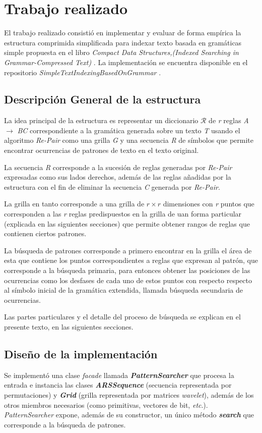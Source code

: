 \chapter{Trabajo realizado}
El trabajo realizado consistió en implementar y evaluar de forma empírica la estructura comprimida
simplificada para indexar texto basada en gramáticas simple propuesta en el libro \textit{Compact Data
Structures,(Indexed Searching in Grammar-Compressed Text)} \cite[Capítulo~10.5.6]{Navarro}. La implementación se encuentra disponible en el repositorio \textit{SimpleTextIndexingBasedOnGrammar}
\cite{SimpleTextIndexing}.

\section{Descripción General de la estructura}
La idea principal de la estructura es representar un diccionario $\mathcal{R}$ de \textit{r} reglas \textit{A} $\rightarrow$ \textit{BC} correspondiente a la gramática generada sobre un texto \textit{T} usando el algoritmo \textit{Re-Pair} como una grilla \textit{G} y una secuencia \textit{R} de símbolos que permite encontrar ocurrencias de patrones de texto en el texto original. 

La secuencia \textit{R} corresponde a la sucesión de reglas generadas por \textit{Re-Pair} expresadas como sus lados derechos, además de las reglas añadidas por la estructura con el fin de eliminar la secuencia \textit{C} generada por \textit{Re-Pair}.

La grilla en tanto corresponde a una grilla de $r \times r$ dimensiones con \textit{r} puntos que corresponden a las \textit{r} reglas predispuestos en la grilla de uan forma particular (explicada en las siguientes secciones) que permite obtener rangos de reglas que contienen ciertos patrones.

La búsqueda de patrones corresponde a primero encontrar en la grilla el área de esta que contiene los puntos correspondientes a reglas que expresan al patrón, que corresponde a la búsqueda primaria, para entonces obtener las posiciones de las ocurrencias como los desfases de cada uno de estos puntos con respecto respecto al símbolo inicial de la gramática extendida, llamada búsqueda secundaria de ocurrencias.

Las partes particulares y el detalle del proceso de búsqueda se explican en el presente texto, en las siguientes secciones.

\section{Diseño de la implementación}
Se implementó una clase \textit{facade} llamada \textit{\textbf{PatternSearcher}} que procesa la entrada e instancia las clases \textit{\textbf{ARSSequence}} (secuencia representada por permutaciones) y \textbf{\textit{Grid}} (grilla representada por matrices \textit{wavelet}), además de los otros miembros necesarios (como primitivas, vectores de bit, \textit{etc}.). \textit{PatternSearcher} expone, además de su constructor, un único método \textit{\textbf{search}} que corresponde a la búsqueda de patrones. 

